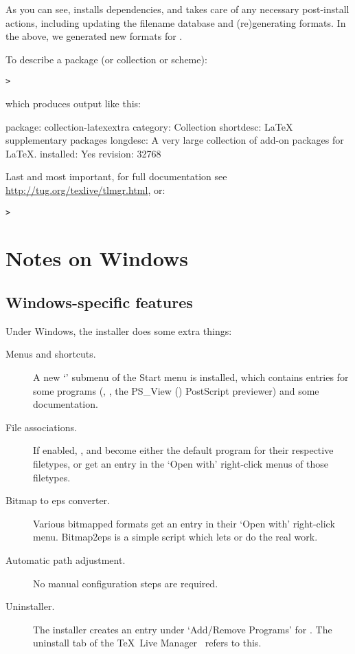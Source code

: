 \documentclass{article}
\begin{document}
As you can see,  installs dependencies, and takes care of any
necessary post-install actions, including updating the filename database
and (re)generating formats.  In the above, we generated new formats for
\XeTeX.

To describe a package (or collection or scheme):
\begin{alltt}
> 
\end{alltt}
which produces output like this:
\begin{fverbatim}
package:    collection-latexextra
category:   Collection
shortdesc:  LaTeX supplementary packages
longdesc:   A very large collection of add-on packages for LaTeX.
installed:  Yes
revision:   32768
\end{fverbatim}

Last and most important, for full documentation see
\url{http://tug.org/texlive/tlmgr.html}, or:
\begin{alltt}
> 
\end{alltt}


\section{Notes on Windows}
\label{sec:windows}

\subsection{Windows-specific features}
\label{sec:winfeatures}

Under Windows, the installer does some extra things:
\begin{description}
\item[Menus and shortcuts.] A new `\TL{}' submenu of the
  Start menu is installed, which contains entries for some \GUI{}
  programs (, , the PS\_View ()
  PostScript previewer) and some documentation.
\item[File associations.] If enabled, , 
  and  become either the default program for
  their respective filetypes, or get an entry in the `Open with'
  right-click menus of those filetypes.
\item[Bitmap to eps converter.] Various bitmapped formats get an
  entry  in their `Open with' right-click
  menu. Bitmap2eps is a simple script which lets  or
   do the real work.
\item[Automatic path adjustment.] No manual configuration steps are required.
\item[Uninstaller.] The installer creates an entry under `Add/Remove
  Programs' for \TL. The uninstall tab of the \TeX\ Live Manager \GUI\
  refers to this.
\end{description}
\end{document}
